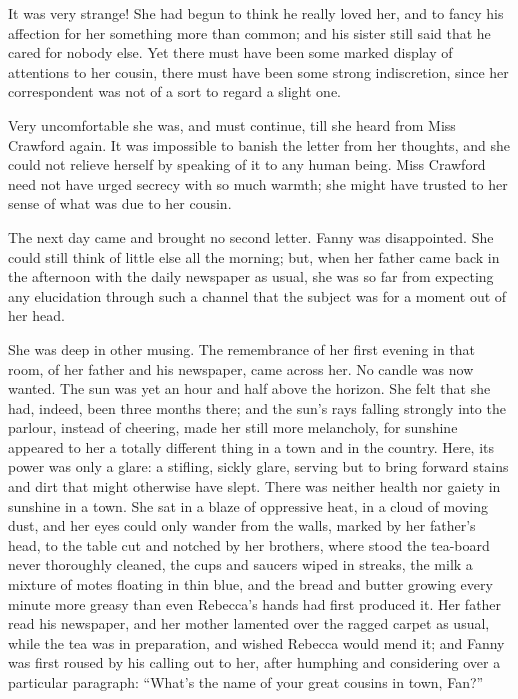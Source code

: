 It was very strange!  She had begun to think he really
loved her, and to fancy his affection for her something
more than common; and his sister still said that he cared
for nobody else.  Yet there must have been some marked
display of attentions to her cousin, there must have
been some strong indiscretion, since her correspondent
was not of a sort to regard a slight one.

Very uncomfortable she was, and must continue, till she
heard from Miss Crawford again.  It was impossible to
banish the letter from her thoughts, and she could not
relieve herself by speaking of it to any human being.
Miss Crawford need not have urged secrecy with so much warmth;
she might have trusted to her sense of what was due
to her cousin.

The next day came and brought no second letter.
Fanny was disappointed.  She could still think of little
else all the morning; but, when her father came back
in the afternoon with the daily newspaper as usual,
she was so far from expecting any elucidation through such
a channel that the subject was for a moment out of her head.

She was deep in other musing.  The remembrance of her first
evening in that room, of her father and his newspaper,
came across her.  No candle was now wanted.
The sun was yet an hour and half above the horizon.
She felt that she had, indeed, been three months there;
and the sun's rays falling strongly into the parlour,
instead of cheering, made her still more melancholy,
for sunshine appeared to her a totally different thing
in a town and in the country.  Here, its power was only
a glare:  a stifling, sickly glare, serving but to bring
forward stains and dirt that might otherwise have slept.
There was neither health nor gaiety in sunshine in a town.
She sat in a blaze of oppressive heat, in a cloud of
moving dust, and her eyes could only wander from the walls,
marked by her father's head, to the table cut and notched
by her brothers, where stood the tea-board never
thoroughly cleaned, the cups and saucers wiped in streaks,
the milk a mixture of motes floating in thin blue,
and the bread and butter growing every minute more
greasy than even Rebecca's hands had first produced it.
Her father read his newspaper, and her mother lamented
over the ragged carpet as usual, while the tea was
in preparation, and wished Rebecca would mend it;
and Fanny was first roused by his calling out to her,
after humphing and considering over a particular paragraph:
``What's the name of your great cousins in town, Fan?''

